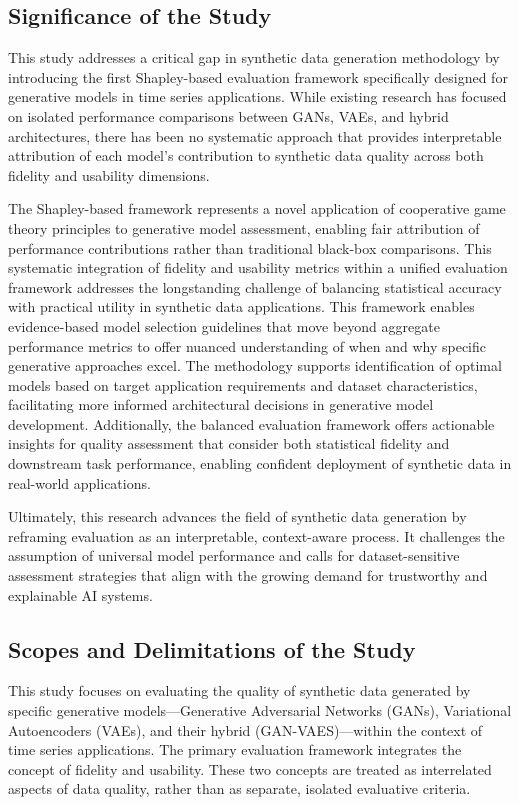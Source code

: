 \documentclass[11pt]{article}
\begin{document}
\subsection{Significance of the Study}

This study addresses a critical gap in synthetic data generation methodology by introducing the first Shapley-based evaluation framework specifically designed for generative models in time series applications. While existing research has focused on isolated performance comparisons between GANs, VAEs, and hybrid architectures, there has been no systematic approach that provides interpretable attribution of each model's contribution to synthetic data quality across both fidelity and usability dimensions.

The Shapley-based framework represents a novel application of cooperative game theory principles to generative model assessment, enabling fair attribution of performance contributions rather than traditional black-box comparisons. This systematic integration of fidelity and usability metrics within a unified evaluation framework addresses the longstanding challenge of balancing statistical accuracy with practical utility in synthetic data applications. This framework enables evidence-based model selection guidelines that move beyond aggregate performance metrics to offer nuanced understanding of when and why specific generative approaches excel. The methodology supports identification of optimal models based on target application requirements and dataset characteristics, facilitating more informed architectural decisions in generative model development. Additionally, the balanced evaluation framework offers actionable insights for quality assessment that consider both statistical fidelity and downstream task performance, enabling confident deployment of synthetic data in real-world applications.

Ultimately, this research advances the field of synthetic data generation by reframing evaluation as an interpretable, context-aware process. It challenges the assumption of universal model performance and calls for dataset-sensitive assessment strategies that align with the growing demand for trustworthy and explainable AI systems.

\subsection{Scopes and Delimitations of the Study}
This study focuses on evaluating the quality of synthetic data generated by specific generative models—Generative Adversarial Networks (GANs), Variational Autoencoders (VAEs), and their hybrid (GAN-VAES)—within the context of time series applications. The primary evaluation framework integrates the concept of fidelity and usability. These two concepts are treated as interrelated aspects of data quality, rather than as separate, isolated evaluative criteria.
\end{document}

